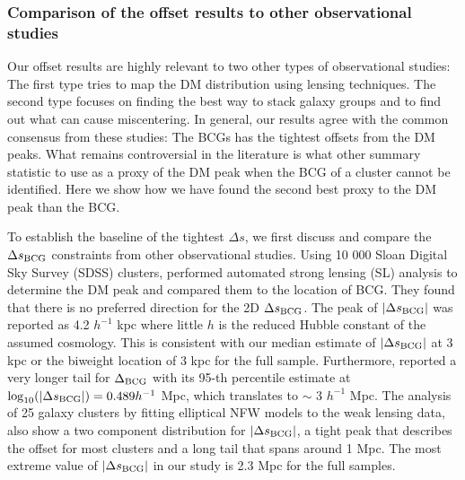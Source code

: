 \subsubsection{Comparison of the offset results to other observational studies}
Our offset results are highly relevant to two other types of
observational studies: 
The first type tries to map the DM distribution using lensing techniques. 
The second type focuses on finding the best way to stack galaxy groups and to
find out what can cause miscentering.
In general, our results agree with the common consensus from these studies: 
The BCGs has the tightest offsets from the DM peaks.
What remains controversial in the literature is what other summary statistic 
to use as a proxy of the DM peak when the BCG of a cluster cannot be
identified. Here we show how we have found the second best proxy to the DM
peak than the BCG.  

To establish the baseline of the tightest $\Delta s$, we first discuss and 
compare the $\Delta s_{\rm BCG}$ constraints from other observational studies.   
Using 10 000 Sloan Digital Sky Survey (SDSS) clusters, \cite{Zitrin2012}
performed automated strong lensing (SL) analysis to determine the DM peak and
compared them to the location of BCG. They  
found that there is no preferred direction for the 2D $\Delta s_{\rm BCG}$. The peak
of $|\Delta s_{\rm BCG}|$ was reported as 4.2 $h^{-1}$ kpc where 
little $h$ is the reduced Hubble constant of the assumed cosmology. 
This is consistent with our median estimate of $|\Delta s_{\rm BCG}|$ at 3 kpc
or the biweight location of 3 kpc for the full sample.  
Furthermore, \cite{Zitrin2012} reported a very longer tail for $\Delta_{\rm BCG}$ with its 95-th
percentile estimate at $\log_{10}(|\Delta s_{\rm BCG}|) = 0.489 h^{-1}$ Mpc, which
translates to $\sim$ 3 $h^{-1}$ Mpc. 
The analysis of 25 galaxy clusters by \cite{Oguri2010} fitting elliptical NFW
models to the weak lensing data, also show a two
component distribution for $|\Delta s_{\rm BCG}|$, a tight peak that describes the
offset for most clusters and a long tail that spans around 1 Mpc.
 The most extreme value of $|\Delta s_{\rm
BCG}|$ in our study is 2.3 Mpc for the full samples.  

